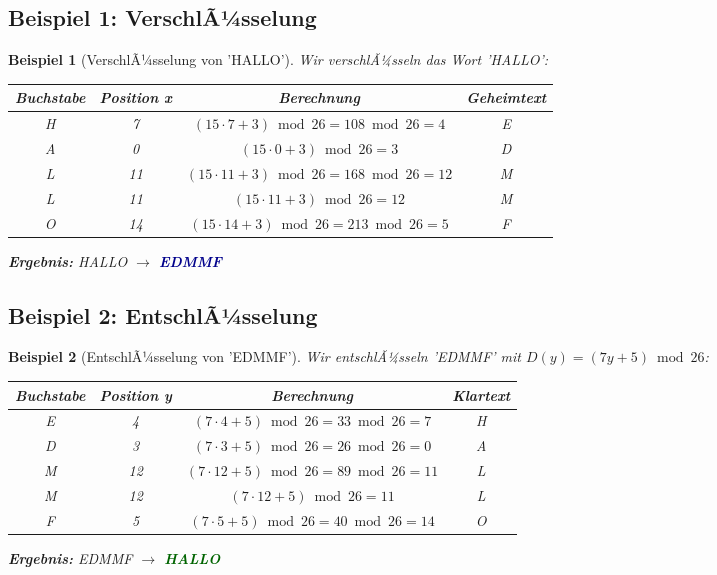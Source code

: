 ﻿\documentclass[12pt,a4paper]{article}
\newtheorem{example}{Beispiel}
\begin{document}
	\subsection{Beispiel 1: VerschlÃ¼sselung}
	
	\begin{example}[VerschlÃ¼sselung von 'HALLO']
		Wir verschlÃ¼sseln das Wort 'HALLO':
		
		\begin{center}
			\small
			\begin{tabular}{c|c|c|c}
				\textbf{Buchstabe} & \textbf{Position x} & \textbf{Berechnung} & \textbf{Geheimtext} \\
				\hline
				H & 7 & $(15 \cdot 7 + 3) \bmod 26 = 108 \bmod 26 = 4$ & E \\
				A & 0 & $(15 \cdot 0 + 3) \bmod 26 = 3$ & D \\
				L & 11 & $(15 \cdot 11 + 3) \bmod 26 = 168 \bmod 26 = 12$ & M \\
				L & 11 & $(15 \cdot 11 + 3) \bmod 26 = 12$ & M \\
				O & 14 & $(15 \cdot 14 + 3) \bmod 26 = 213 \bmod 26 = 5$ & F \\
			\end{tabular}
		\end{center}
		
		\textbf{Ergebnis:} HALLO $\to$ \textcolor{darkblue}{\textbf{EDMMF}}
	\end{example}
	
	\subsection{Beispiel 2: EntschlÃ¼sselung}
	
	\begin{example}[EntschlÃ¼sselung von 'EDMMF']
		Wir entschlÃ¼sseln 'EDMMF' mit $D(y) = (7y + 5) \bmod 26$:
		
		\begin{center}
			\begin{tabular}{c|c|c|c}
				\textbf{Buchstabe} & \textbf{Position y} & \textbf{Berechnung} & \textbf{Klartext} \\
				\hline
				E & 4 & $(7 \cdot 4 + 5) \bmod 26 = 33 \bmod 26 = 7$ & H \\
				D & 3 & $(7 \cdot 3 + 5) \bmod 26 = 26 \bmod 26 = 0$ & A \\
				M & 12 & $(7 \cdot 12 + 5) \bmod 26 = 89 \bmod 26 = 11$ & L \\
				M & 12 & $(7 \cdot 12 + 5) \bmod 26 = 11$ & L \\
				F & 5 & $(7 \cdot 5 + 5) \bmod 26 = 40 \bmod 26 = 14$ & O \\
			\end{tabular}
		\end{center}
		
		\textbf{Ergebnis:} EDMMF $\to$ \textcolor{darkgreen}{\textbf{HALLO}} \checkmark
	\end{example}
	
\end{document}
